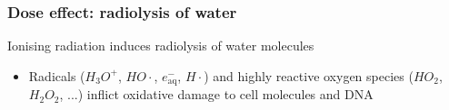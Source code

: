 \documentclass{beamer}
\begin{document}
\begin{frame}
  \frametitle{Dose effect: radiolysis of water}
  Ionising radiation induces radiolysis of water molecules
  \begin{itemize}
  \item Radicals ($\scriptstyle H_3O^+$, $\scriptstyle HO\cdot$,
    $\scriptstyle e^-_{\mathrm{aq}}$, $\scriptstyle  H\cdot$) and highly reactive
    oxygen species ($\scriptstyle HO_2$, $\scriptstyle  H_2O_2$, ...) inflict oxidative damage to
    cell molecules and DNA
  \end{itemize}
\end{frame}
\end{document}
